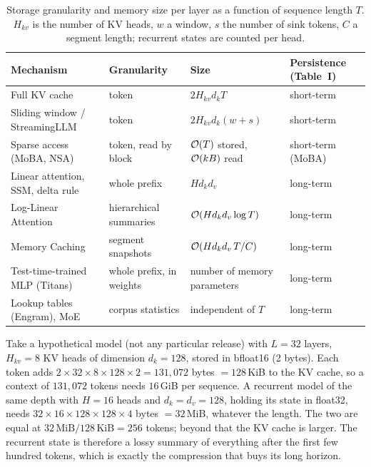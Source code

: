 \begin{table}[t]
\centering\small
\caption{Storage granularity and memory size per layer as a function of sequence length $T$.
$H_{kv}$ is the number of KV heads, $w$ a window, $s$ the number of sink tokens, $C$ a segment
length; recurrent states are counted per head.}
\label{tab:c02-state-size}
\begin{tabularx}{\textwidth}{@{}>{\raggedright\arraybackslash}p{3.6cm}>{\raggedright\arraybackslash}p{2.0cm}>{\raggedright\arraybackslash}p{3.0cm}>{\raggedright\arraybackslash}X@{}}
\toprule
Mechanism & Granularity & Size & Persistence (Table~I) \\
\midrule
Full KV cache & token & $2H_{kv}d_kT$ & short-term \\
Sliding window / StreamingLLM & token & $2H_{kv}d_k(w + s)$ & short-term \\
Sparse access (MoBA, NSA) & token, read by block & $\mathcal{O}(T)$ stored, $\mathcal{O}(kB)$ read & short-term (MoBA) \\
Linear attention, SSM, delta rule & whole prefix & $H d_k d_v$ & long-term \\
Log-Linear Attention & hierarchical summaries & $\mathcal{O}(H d_k d_v \log T)$ & long-term \\
Memory Caching & segment snapshots & $\mathcal{O}(H d_k d_v\, T/C)$ & long-term \\
Test-time-trained MLP (Titans) & whole prefix, in weights & number of memory parameters & long-term \\
Lookup tables (Engram), MoE & corpus statistics & independent of $T$ & long-term \\
\bottomrule
\end{tabularx}
\end{table}

\begin{example}\label{ex:c02-bytes}
Take a hypothetical model (not any particular release) with $L = 32$ layers, $H_{kv} = 8$ KV heads
of dimension $d_k = 128$, stored in bfloat16 (2 bytes). Each token adds
$2 \times 32 \times 8 \times 128 \times 2 = 131{,}072$ bytes $= 128$\,KiB to the KV cache, so a
context of $131{,}072$ tokens needs $16$\,GiB per sequence. A recurrent model of the same depth with
$H = 16$ heads and $d_k = d_v = 128$, holding its state in float32, needs
$32 \times 16 \times 128 \times 128 \times 4$ bytes $= 32$\,MiB, whatever the length. The two are
equal at $32\,\mathrm{MiB}/128\,\mathrm{KiB} = 256$ tokens; beyond that the KV cache is larger. The
recurrent state is therefore a lossy summary of everything after the first few hundred tokens,
which is exactly the compression that buys its long horizon.
\end{example}

